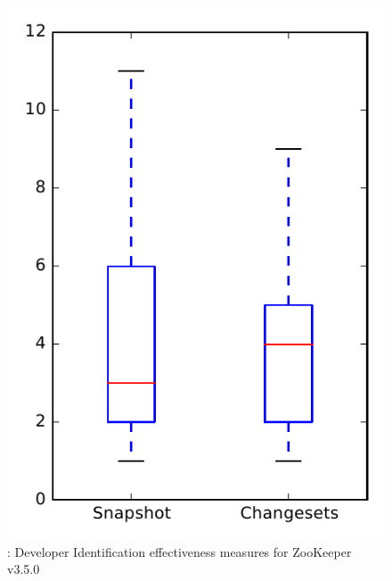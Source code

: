 
\begin{figure}
\centering
\includegraphics[height=0.4\textheight]{figures/dit/rq1_zookeeper_no_outlier}
\caption{\done: Developer Identification effectiveness measures for ZooKeeper v3.5.0}
\label{fig:dit:rq1:zookeeper}
\end{figure}
